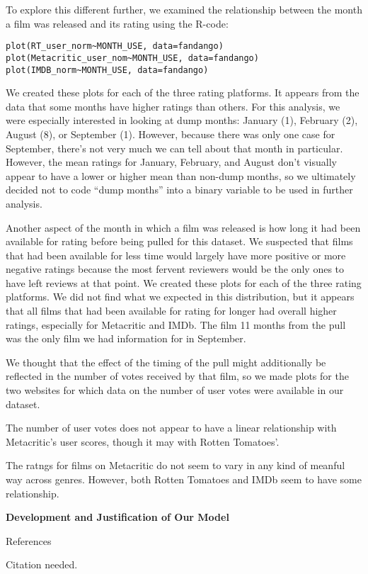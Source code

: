 \documentclass[letter,12pt]{article}
\begin{document}
	To explore this different further, we examined the relationship between the month a film was released and its rating using the R-code:
	\begin{verbatim}
plot(RT_user_norm~MONTH_USE, data=fandango)
plot(Metacritic_user_nom~MONTH_USE, data=fandango)
plot(IMDB_norm~MONTH_USE, data=fandango)
	\end{verbatim}
	We created these plots for each of the three rating platforms.
	It appears from the data that some months have higher ratings than others. For this analysis, we were especially interested in looking at dump months: January (1), February (2), August (8), or September (1). However, because there was only one case for September, there’s not very much we can tell about that month in particular. However, the mean ratings for January, February, and August don’t visually appear to have a lower or higher mean than non-dump months, so we ultimately decided not to code “dump months” into a binary variable to be used in further analysis. 

	Another aspect of the month in which a film was released is how long it had been available for rating before being pulled for this dataset. We suspected that films that had been available for less time would largely have more positive or more negative ratings because the most fervent reviewers would be the only ones to have left reviews at that point. 
	We created these plots for each of the three rating platforms.
	We did not find what we expected in this distribution, but it appears that all films that had been available for rating for longer had overall higher ratings, especially for Metacritic and IMDb. The film 11 months from the pull was the only film we had information for in September. 

	We thought that the effect of the timing of the pull might additionally be reflected in the number of votes received by that film, so we made plots for the two websites for which data on the number of user votes were available in our dataset.

	The number of user votes does not appear to have a linear relationship with Metacritic's user scores, though it may with Rotten Tomatoes'.

	The ratngs for films on Metacritic do not seem to vary in any kind of meanful way across genres. However, both Rotten Tomatoes and IMDb seem to have some relationship.

	\begin{center}
		\textbf{Development and Justification of Our Model}
	\end{center}
	\justify
	\lipsum[14-17]
	
	\newpage
	
	\begin{center}
		References
	\end{center}
	\raggedright
	\begin{hangparas}{.5in}{1}
		Citation needed.
	\end{hangparas}
\end{document}
